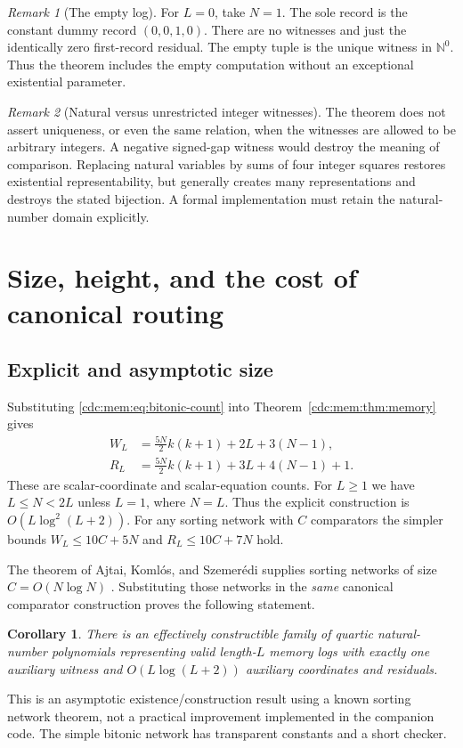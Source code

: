 \documentclass[11pt,a4paper]{article}
\newtheorem{corollary}[corollary]{Corollary}
\theoremstyle{definition}
\theoremstyle{remark}
\newtheorem{remark}[remark]{Remark}
\newcommand{\N}{\mathbb N}
\newcommand{\srctag}[1]{\texorpdfstring{\hspace{0.5em}{\normalfont\small\color{accent}[#1]}}{ [#1]}}
\begin{document}
\begin{remark}[The empty log]
For $L=0$, take $N=1$. The sole record is the constant dummy record $(0,0,1,0)$.
There are no witnesses and just the identically zero first-record residual.
The empty tuple is the unique witness in $\N^0$. Thus the theorem includes the
empty computation without an exceptional existential parameter.
\end{remark}

\begin{remark}[Natural versus unrestricted integer witnesses]
The theorem does not assert uniqueness, or even the same relation, when the
witnesses are allowed to be arbitrary integers. A negative signed-gap witness
would destroy the meaning of comparison. Replacing natural variables by sums
of four integer squares restores existential representability, but generally
creates many representations and destroys the stated bijection. A formal
implementation must retain the natural-number domain explicitly.
\end{remark}

\section{Size, height, and the cost of canonical routing\srctag{03}}\label{cdc:mem:sec:resources}
\subsection{Explicit and asymptotic size}
Substituting \eqref{cdc:mem:eq:bitonic-count} into Theorem~\ref{cdc:mem:thm:memory} gives
\begin{align}
 W_L&=\frac{5N}{2}k(k+1)+2L+3(N-1),\label{cdc:mem:eq:explicit-w}\\
 R_L&=\frac{5N}{2}k(k+1)+3L+4(N-1)+1.\label{cdc:mem:eq:explicit-r}
\end{align}
These are scalar-coordinate and scalar-equation counts. For $L\geq1$ we have
$L\leq N<2L$ unless $L=1$, where $N=L$. Thus the explicit construction is
$O(L\log^2(L+2))$. For any sorting network with $C$ comparators the simpler
bounds $W_L\leq10C+5N$ and $R_L\leq10C+7N$ hold.

The theorem of Ajtai, Koml\'os, and Szemer\'edi supplies sorting networks of size
$C=O(N\log N)$ \cite{aks}. Substituting those networks in the \emph{same}
canonical comparator construction proves the following statement.
\begin{corollary}\label{cdc:mem:cor:optimal-size}
There is an effectively constructible family of quartic natural-number
polynomials representing valid length-$L$ memory logs with exactly one
auxiliary witness and $O(L\log(L+2))$ auxiliary coordinates and residuals.
\end{corollary}
This is an asymptotic existence/construction result using a known sorting
network theorem, not a practical improvement implemented in the companion
code. The simple bitonic network has transparent constants and a short checker.
\end{document}

